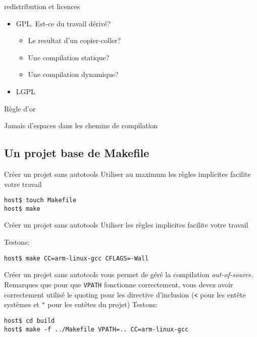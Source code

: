\begin{frame}[fragile=singleslide]{redistribution et licences}
  \begin{itemize} 
  \item GPL. Est-ce du travail dérivé?
    \begin{itemize} 
    \item Le resultat d'un copier-coller?
    \item Une compilation statique?
    \item Une compilation dynamique?
    \end{itemize} 
  \item LGPL
  \end{itemize} 
\end{frame}


\begin{frame}[fragile=singleslide]{Règle d'or}
  \begin{center}
    \huge{Jamais d'espaces dans les chemins de compilation}
  \end{center}
\end{frame}

\subsection{Un projet base de Makefile}

\begin{frame}[fragile=singleslide]{Créer un projet sans autotools}
  Utiliser au maximum les règles implicites facilite votre travail
\begin{lstlisting}
host$ touch Makefile
host$ make
\end{lstlisting} %
\end{frame}

\begin{frame}[fragile=singleslide]{Créer un projet sans autotools}
  Utiliser les règles implicites facilite votre travail
  
  Testons:
\begin{lstlisting}
host$ make CC=arm-linux-gcc CFLAGS=-Wall
\end{lstlisting} %
\end{frame}

\begin{frame}[fragile=singleslide]{Créer un projet sans autotools}
   vous permet de géré la compilation \emph{out-of-source}.
  Remarques que pour que \verb+VPATH+ fonctionne correctement, vous devez avoir
  correctement utilisé le quoting pour les directive d'inclusion (\verb+<+ pour
  les entête systèmes et \verb+"+ pour les entêtes du projet)
  Testons:
\begin{lstlisting}
host$ cd build
host$ make -f ../Makefile VPATH=.. CC=arm-linux-gcc 
\end{lstlisting} %
\end{frame}

